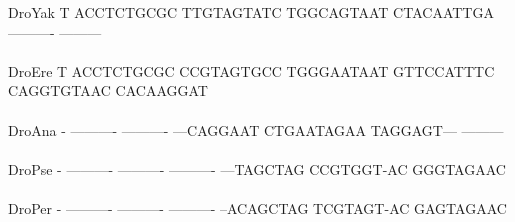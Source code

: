 \documentclass[11pt,twoside,reqno,a4paper]{article}
\begin{document}
{DroYak	T	ACCTCTGCGC	TTGTAGTATC	TGGCAGTAAT	CTACAATTGA	----------	---------\\
\hspace*{7\charwidth}\hspace*{1\charwidth}\hspace*{1\charwidth}\hspace*{1\charwidth}\hspace*{1\charwidth}\hspace*{1\charwidth}\hspace*{1\charwidth}\\
DroEre	T	ACCTCTGCGC	CCGTAGTGCC	TGGGAATAAT	GTTCCATTTC	CAGGTGTAAC	CACAAGGAT\\
\hspace*{7\charwidth}\hspace*{1\charwidth}\hspace*{1\charwidth}\hspace*{1\charwidth}\hspace*{1\charwidth}\hspace*{1\charwidth}\hspace*{1\charwidth}\\
DroAna	-	----------	----------	---CAGGAAT	CTGAATAGAA	TAGGAGT---	---------\\
\hspace*{7\charwidth}\hspace*{1\charwidth}\hspace*{1\charwidth}\hspace*{1\charwidth}\hspace*{1\charwidth}\hspace*{1\charwidth}\hspace*{1\charwidth}\\
DroPse	-	----------	----------	----------	---TAGCTAG	CCGTGGT-AC	GGGTAGAAC\\
\hspace*{7\charwidth}\hspace*{1\charwidth}\hspace*{1\charwidth}\hspace*{1\charwidth}\hspace*{1\charwidth}\hspace*{1\charwidth}\hspace*{1\charwidth}\\
DroPer	-	----------	----------	----------	--ACAGCTAG	TCGTAGT-AC	GAGTAGAAC\\
\hspace*{7\charwidth}\hspace*{1\charwidth}\hspace*{1\charwidth}\hspace*{1\charwidth}\hspace*{1\charwidth}\hspace*{1\charwidth}\hspace*{1\charwidth}\\
}
\end{document}
